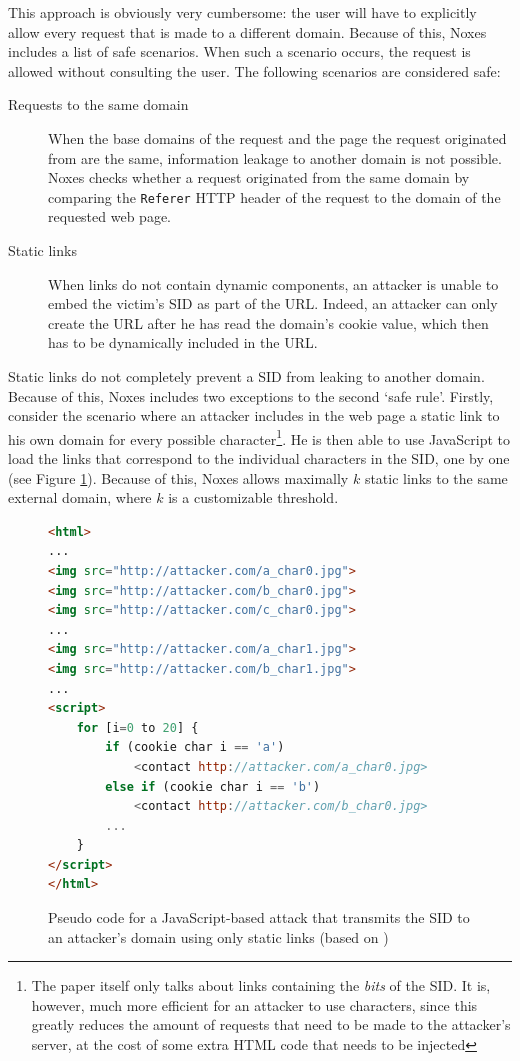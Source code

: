 This approach is obviously very cumbersome: the user will have to explicitly allow every request that is made to a different domain. Because of this, Noxes includes a list of safe scenarios. When such a scenario occurs, the request is allowed without consulting the user. The following scenarios are considered safe:
\begin{description}
	\item[Requests to the same domain] When the base domains of the request and the page the request originated from are the same, information leakage to another domain is not possible. Noxes checks whether a request originated from the same domain by comparing the \texttt{Referer} HTTP header of the request to the domain of the requested web page.
	\item[Static links] When links do not contain dynamic components, an attacker is unable to embed the victim's SID as part of the URL. Indeed, an attacker can only create the URL after he has read the domain's cookie value, which then has to be dynamically included in the URL.
\end{description}
Static links do not completely prevent a SID from leaking to another domain. Because of this, Noxes includes two exceptions to the second `safe rule'. Firstly, consider the scenario where an attacker includes in the web page a static link to his own domain for every possible character\footnote{The paper itself only talks about links containing the \emph{bits} of the SID. It is, however, much more efficient for an attacker to use characters, since this greatly reduces the amount of requests that need to be made to the attacker's server, at the cost of some extra HTML code that needs to be injected}. He is then able to use JavaScript to load the links that correspond to the individual characters in the SID, one by one (see Figure \ref{Noxes-attack}). Because of this, Noxes allows maximally $k$ static links to the same external domain, where $k$ is a customizable threshold.

\begin{figure}
\begin{lstlisting}[language=HTML]
<html>
...
<img src="http://attacker.com/a_char0.jpg">
<img src="http://attacker.com/b_char0.jpg">
<img src="http://attacker.com/c_char0.jpg">
...
<img src="http://attacker.com/a_char1.jpg">
<img src="http://attacker.com/b_char1.jpg">
...
<script>
    for [i=0 to 20] {
        if (cookie char i == 'a')
            <contact http://attacker.com/a_char0.jpg>
        else if (cookie char i == 'b')
            <contact http://attacker.com/b_char0.jpg>
        ...
    }
</script>
</html>
\end{lstlisting}
	\caption[Using static links to transmit the SID to an attacker's domain]{\label{Noxes-attack}Pseudo code for a JavaScript-based attack that transmits the SID to an attacker's domain using only static links (based on \cite{Kirda2006})}
\end{figure}

